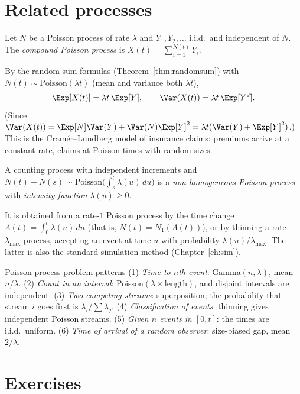 \section{Related processes}

\begin{definition}
Let $N$ be a Poisson process of rate $\lambda$ and $Y_1,Y_2,\dots$ i.i.d.\ and independent
of $N$. The \emph{compound Poisson process} is $X(t)=\sum_{i=1}^{N(t)}Y_i$.
\end{definition}

By the random-sum formulas (Theorem~\ref{thm:randomsum}) with $N(t)\sim\mathrm{Poisson}(\lambda t)$
(mean and variance both $\lambda t$),
\[
\Exp[X(t)]=\lambda t\,\Exp[Y],\qquad\Var(X(t))=\lambda t\,\Exp[Y^2].
\]
(Since $\Var(X(t))=\Exp[N]\Var(Y)+\Var(N)\Exp[Y]^2=\lambda t(\Var(Y)+\Exp[Y]^2)$.) This is the
Cram\'er--Lundberg model of insurance claims: premiums arrive at a constant rate, claims at
Poisson times with random sizes.

\begin{definition}
A counting process with independent increments and
$N(t)-N(s)\sim\mathrm{Poisson}\bigl(\int_s^t\lambda(u)\,du\bigr)$ is a
\emph{non-homogeneous Poisson process} with \emph{intensity function} $\lambda(u)\ge0$.
\end{definition}

It is obtained from a rate-$1$ Poisson process by the time change
$\Lambda(t)=\int_0^t\lambda(u)\,du$ (that is, $N(t)=N_1(\Lambda(t))$), or by thinning a
rate-$\lambda_{\max}$ process, accepting an event at time $u$ with probability
$\lambda(u)/\lambda_{\max}$. The latter is also the standard simulation method
(Chapter~\ref{ch:sim}).

\begin{interview}{Poisson process problem patterns}
(1) \emph{Time to $n$th event}: Gamma$(n,\lambda)$, mean $n/\lambda$. (2) \emph{Count in an
interval}: Poisson$(\lambda\times\text{length})$, and disjoint intervals are independent.
(3) \emph{Two competing streams}: superposition; the probability that stream $i$ goes first
is $\lambda_i/\sum\lambda_j$. (4) \emph{Classification of events}: thinning gives independent
Poisson streams. (5) \emph{Given $n$ events in $[0,t]$}: the times are i.i.d.\ uniform.
(6) \emph{Time of arrival of a random observer}: size-biased gap, mean $2/\lambda$.
\end{interview}

\section*{Exercises}

